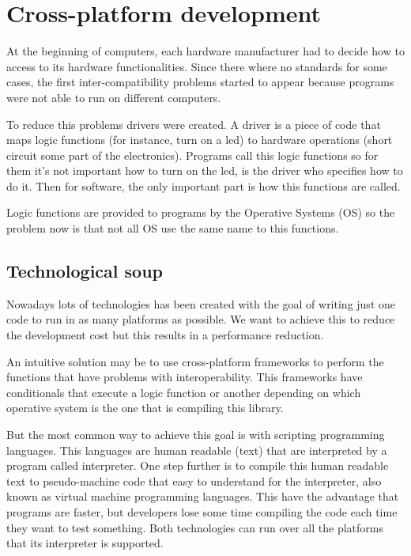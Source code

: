 \chapter{Cross-platform development}

At the beginning of computers, each hardware manufacturer had to decide how to
access to its hardware functionalities. Since there where no standards for some
cases, the first inter-compatibility problems started to appear because
programs were not able to run on different computers.

To reduce this problems drivers were created. A driver is a piece of code that 
maps logic functions (for instance, turn on a led) to hardware operations 
(short circuit some part of the electronics). Programs call this logic functions
so for them it's not important how to turn on the led, is the driver who 
specifies how to do it. Then for software, the only important part is how this
functions are called.

Logic functions are provided to programs by the Operative Systems (OS) so the 
problem now is that not all OS use the same name to this functions.

\section{Technological soup}

Nowadays lots of technologies has been created with the goal of writing just
one code to run in as many platforms as possible. We want to achieve this
to reduce the development cost but this results in a performance reduction.

An intuitive solution may be to use cross-platform frameworks to perform the 
functions that have problems with interoperability. This frameworks have 
conditionals that execute a logic function or another depending on which 
operative system is the one that is compiling this library.

But the most common way to achieve this goal is with scripting programming
languages. This languages are human readable (text) that are interpreted by a
program called interpreter. One step further is to compile this human readable
text to pseudo-machine code that easy to understand for the interpreter, also
known as virtual machine programming languages. This have the advantage that 
programs are faster, but developers lose some time compiling the code each time 
they want to test something. Both technologies can run over all the platforms
that its interpreter is supported.

